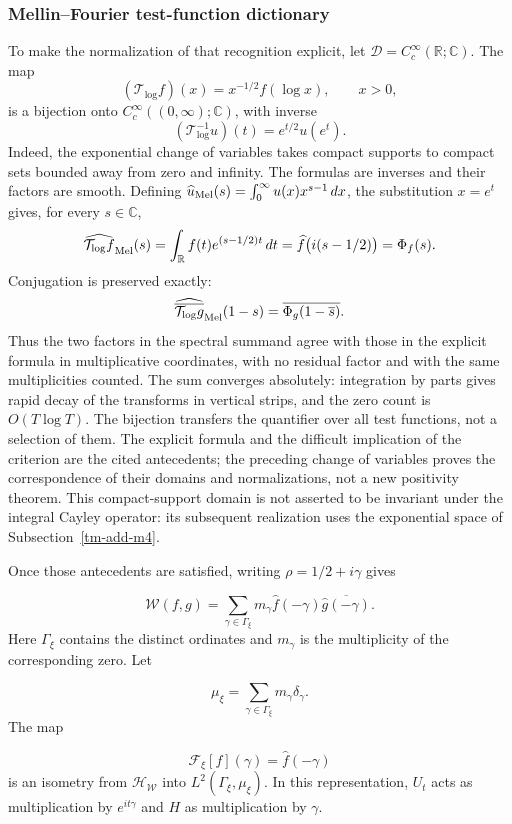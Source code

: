 \subsubsection*{Mellin--Fourier test-function dictionary}
\label{rz:mellin-fourier}
To make the normalization of that recognition explicit, let
\(\mathcal D=C_c^\infty(\mathbb R;\mathbb C)\). The map
\[
 (\mathcal T_{\log}f)(x)=x^{-1/2}f(\log x),\qquad x>0,
\]
is a bijection onto \(C_c^\infty((0,\infty);\mathbb C)\), with inverse
\[
 (\mathcal T_{\log}^{-1}u)(t)=e^{t/2}u(e^t).
\]
Indeed, the exponential change of variables takes compact supports to compact sets
bounded away from zero and infinity. The formulas are inverses and their factors
are smooth. Defining
\(\widehat u_{\rm Mel}(s)=\int_0^\infty u(x)x^{s-1}\,dx\),
the substitution \(x=e^t\) gives, for every \(s\in\mathbb C\),
\[
 \widehat{\mathcal T_{\log}f}_{\rm Mel}(s)
 =\int_{\mathbb R}f(t)e^{(s-1/2)t}\,dt
 =\widehat f\bigl(i(s-1/2)\bigr)=\Phi_f(s).
\]
Conjugation is preserved exactly:
\[
 \widehat{\overline{\mathcal T_{\log}g}}_{\rm Mel}(1-s)
 =\overline{\Phi_g(1-\overline s)}.
\]
Thus the two factors in the spectral summand agree with those in the
explicit formula in multiplicative coordinates, with no residual factor
and with the same multiplicities counted. The sum converges absolutely:
integration by parts gives rapid decay of the transforms
in vertical strips, and the zero count is \(O(T\log T)\).
The bijection transfers the quantifier over all test functions, not a
selection of them. The explicit formula and the difficult implication of the
criterion are the cited antecedents; the preceding change of variables
proves the correspondence of their domains and normalizations, not a new
positivity theorem. This compact-support domain is not asserted to be invariant under
the integral Cayley operator: its subsequent realization uses the exponential space
of Subsection~\ref{tm-add-m4}.

Once those antecedents are satisfied, writing \(\rho=1/2+i\gamma\) gives

\[
\mathscr W(f,g)
=\sum_{\gamma\in\Gamma_\xi}
m_\gamma\widehat f(-\gamma)\overline{\widehat g(-\gamma)}.
\]
Here \(\Gamma_\xi\) contains the distinct ordinates and \(m_\gamma\) is the multiplicity of the corresponding zero. Let

\[
\mu_\xi=\sum_{\gamma\in\Gamma_\xi}m_\gamma\delta_\gamma.
\]
The map

\[
\mathcal F_\xi[f](\gamma)=\widehat f(-\gamma)
\]
is an isometry from \(\mathcal H_{\mathscr W}\) into \(L^2(\Gamma_\xi,\mu_\xi)\). In this representation, \(U_t\) acts as multiplication by \(e^{it\gamma}\) and \(H\) as multiplication by \(\gamma\).

